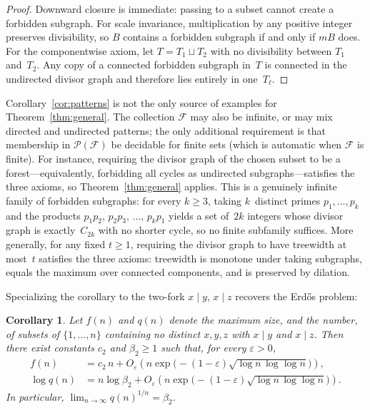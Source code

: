 \documentclass[11pt]{amsart}
\newtheorem{corollary}[theorem]{Corollary}
\begin{document}
\begin{proof}
Downward closure is immediate: passing to a subset cannot create a forbidden subgraph. For scale invariance, multiplication by any positive integer preserves divisibility, so \(B\) contains a forbidden subgraph if and only if \(mB\) does. For the componentwise axiom, let \(T=T_1\sqcup T_2\) with no divisibility between \(T_1\) and~\(T_2\). Any copy of a connected forbidden subgraph in~\(T\) is connected in the undirected divisor graph and therefore lies entirely in one~\(T_\ell\).
\end{proof}

Corollary~\ref{cor:patterns} is not the only source of examples for Theorem~\ref{thm:general}. The collection \(\mathcal{F}\) may also be infinite, or may mix directed and undirected patterns; the only additional requirement is that membership in \(\mathcal{P}(\mathcal{F})\) be decidable for finite sets (which is automatic when \(\mathcal{F}\) is finite). For instance, requiring the divisor graph of the chosen subset to be a forest---equivalently, forbidding all cycles as undirected subgraphs---satisfies the three axioms, so Theorem~\ref{thm:general} applies. This is a genuinely infinite family of forbidden subgraphs: for every \(k\ge 3\), taking \(k\)~distinct primes \(p_1,\dots,p_k\) and the products \(p_1 p_2,\, p_2 p_3,\,\dots,\, p_k p_1\) yields a set of~\(2k\) integers whose divisor graph is exactly~\(C_{2k}\) with no shorter cycle, so no finite subfamily suffices. More generally, for any fixed \(t\ge 1\), requiring the divisor graph to have treewidth at most~\(t\) satisfies the three axioms: treewidth is monotone under taking subgraphs, equals the maximum over connected components, and is preserved by dilation.

Specializing the corollary to the two-fork \(x\mid y\), \(x\mid z\) recovers the Erd\H{o}s problem:

\begin{corollary}\label{cor:erdos}
Let \(f(n)\) and \(q(n)\) denote the maximum size, and the number, of subsets of \(\{1,\dots,n\}\) containing no distinct \(x,y,z\) with \(x\mid y\) and \(x\mid z\). Then there exist constants \(c_2\) and \(\beta_2\ge 1\) such that, for every \(\varepsilon>0\),
\begin{align*}
f(n)&=c_2\,n+O_{\varepsilon}\!\left(n\exp\!\bigl(-(1-\varepsilon)\sqrt{\log n\,\log\log n}\bigr)\right),\\
\log q(n)&=n\log\beta_2+O_{\varepsilon}\!\left(n\exp\!\bigl(-(1-\varepsilon)\sqrt{\log n\,\log\log n}\bigr)\right).
\end{align*}
In particular, \(\lim_{n\to\infty}q(n)^{1/n}=\beta_2\).
\end{corollary}
\end{document}
